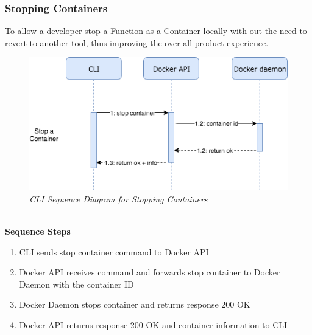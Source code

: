 \subsubsection{Stopping Containers}
To allow a developer stop a Function as a Container locally with out the need to revert to another tool, thus improving the over all product experience.
\begin{figure}[!ht]
\centering
\includegraphics*[width=1\textwidth]{images/sec-stop-con.png}
\caption{\em CLI Sequence Diagram for Stopping Containers}
\label{img:cli_seq5}
\end{figure}
\\\textbf{Sequence Steps}
\begin{enumerate}
  \item CLI sends stop container command to Docker API
  \item Docker API receives command and forwards stop container to Docker Daemon with the container ID
  \item Docker Daemon stops container and returns response 200 OK
  \item Docker API returns response 200 OK and container information to CLI
\end{enumerate}
\clearpage


